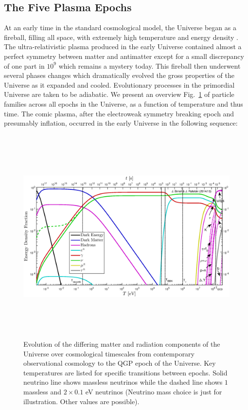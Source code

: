\documentclass[universe,article,submit,moreauthors,pdftex,a4paper]{Definitions/mdpi}
\newcommand*{\rf}[1]{Fig.~{\ref{#1}}}
\begin{document}
\subsection{The Five Plasma Epochs}\label{sec:Timeline}
\noindent At an early time in the standard cosmological model, the Universe began as a fireball, filling all space, with extremely high temperature and energy density \cite{Rafelski:2015cxa}. The ultra-relativistic plasma produced in the early Universe contained almost a perfect symmetry between matter and antimatter except for a small discrepancy of one part in $10^{9}$ which remains a mystery today. This fireball then underwent several phases changes which dramatically evolved the gross properties of the Universe as it expanded and cooled. Evolutionary processes in the primordial Universe are taken to be adiabatic. We present an overview \rf{CosmicFraction} of particle families across all epochs in the Universe, as a function of temperature and thus time. The comic plasma, after the electroweak symmetry breaking epoch and presumably inflation, occurred in the early Universe in the following sequence:
\begin{figure}
  \centerline{\hspace*{0.4cm}\includegraphics[height=11cm]{./plots/energy_fractions.eps}}
  \caption{Evolution of the differing matter and radiation components of the Universe over cosmological timescales from contemporary observational cosmology to the QGP epoch of the Universe. Key temperatures are listed for specific transitions between epochs. Solid neutrino line shows massless neutrinos while the dashed line shows $1$ massless and $2\times 0.1$ eV neutrinos (Neutrino mass choice is just for illustration.  Other values are possible). \label{CosmicFraction}}
\end{figure}
\end{document}
